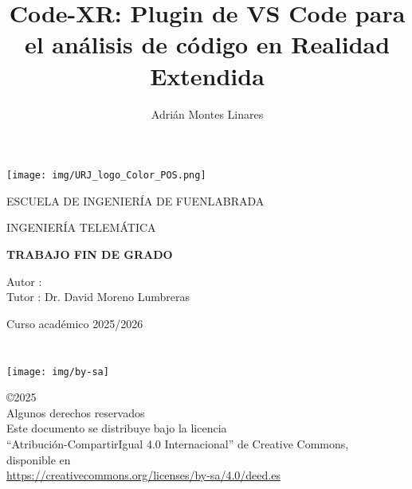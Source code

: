 \documentclass[a4paper, 12pt]{book}
\title{Code-XR: Plugin de VS Code para el análisis de código en Realidad Extendida}
\author{Adrián Montes Linares}
\makeatletter
\let\thetitle\@title
\let\theauthor\@author
\makeatother
\begin{document}
\renewcommand{\refname}{Bibliografía}  %
\renewcommand{\appendixname}{Apéndice}



\begin{titlepage}
\begin{center}
\texttt{[image: img/URJ\_logo\_Color\_POS.png]}

\vspace{1.75cm}

\LARGE
ESCUELA DE INGENIERÍA DE FUENLABRADA
\vspace{1cm}

\LARGE
INGENIERÍA TELEMÁTICA

\vspace{1cm}
\LARGE
\textbf{TRABAJO FIN DE GRADO}

\vspace{2cm}

\Large
\MakeUppercase{\thetitle}

\vspace{2cm}

\large
Autor : \theauthor \\
Tutor : Dr. David Moreno Lumbreras\\
\vspace{1cm}

\large
Curso académico 2025/2026

\end{center}
\end{titlepage}

\newpage
\mbox{}
\thispagestyle{empty} %



\clearpage
{}
\chapter*{}

\vspace{12cm}


\begin{flushright}
\texttt{[image: img/by-sa]}

\noindent©2025 \theauthor  \\
Algunos derechos reservados  \\
Este documento se distribuye bajo la licencia \\
``Atribución-CompartirIgual 4.0 Internacional'' de Creative Commons, \\
disponible en \\
\url{https://creativecommons.org/licenses/by-sa/4.0/deed.es}
\end{flushright}
\end{document}

